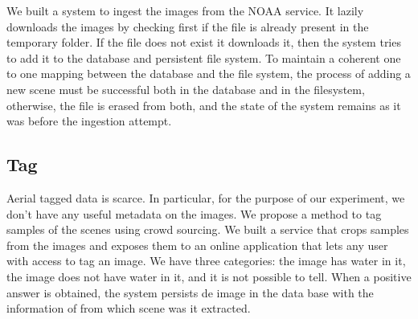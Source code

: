 \begin{figure}[h]
  \begin{center}
  \end{center}
\end{figure}

We built a system to ingest the images from the NOAA service. It lazily downloads the images by checking first if the file is already present in the temporary folder. If the file does not exist it downloads it, then the system tries to add it to the database and persistent file system. To maintain a coherent one to one mapping between the database and the file system, the process of adding a new scene must be successful both in the database and in the filesystem, otherwise, the file is erased from both, and the state of the system remains as it was before the ingestion attempt.\\

\subsection{Tag}


Aerial tagged data is scarce. In particular, for the purpose of our experiment, we don't have any useful metadata on the images. We propose a method to tag samples of the scenes using crowd sourcing. We built a service that crops samples from the images and exposes them to an online application that lets any user with access to tag an image. We have three categories: the image has water in it, the image does not have water in it, and it is not possible to tell. When a positive answer is obtained, the system persists de image in the data base with the information of from which scene was it extracted.\\


